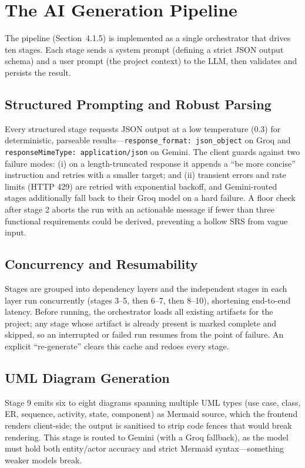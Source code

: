 \documentclass[12pt,a4paper,oneside]{report}
\begin{document}
\section{The AI Generation Pipeline}
The pipeline (Section~4.1.5) is implemented as a single orchestrator that drives ten stages. Each stage sends a system prompt (defining a strict JSON output schema) and a user prompt (the project context) to the LLM, then validates and persists the result.

\subsection{Structured Prompting and Robust Parsing}
Every structured stage requests JSON output at a low temperature (0.3) for deterministic, parseable results---\texttt{response\_format: json\_object} on Groq and \texttt{responseMimeType: application/json} on Gemini. The client guards against two failure modes: (i) on a length-truncated response it appends a ``be more concise'' instruction and retries with a smaller target; and (ii) transient errors and rate limits (HTTP 429) are retried with exponential backoff, and Gemini-routed stages additionally fall back to their Groq model on a hard failure. A floor check after stage 2 aborts the run with an actionable message if fewer than three functional requirements could be derived, preventing a hollow SRS from vague input.

\subsection{Concurrency and Resumability}
Stages are grouped into dependency layers and the independent stages in each layer run concurrently (stages 3--5, then 6--7, then 8--10), shortening end-to-end latency. Before running, the orchestrator loads all existing artifacts for the project; any stage whose artifact is already present is marked complete and skipped, so an interrupted or failed run resumes from the point of failure. An explicit ``re-generate'' clears this cache and redoes every stage.

\subsection{UML Diagram Generation}
Stage 9 emits six to eight diagrams spanning multiple UML types (use case, class, ER, sequence, activity, state, component) as Mermaid source, which the frontend renders client-side; the output is sanitised to strip code fences that would break rendering. This stage is routed to Gemini (with a Groq fallback), as the model must hold both entity/actor accuracy and strict Mermaid syntax---something weaker models break.
\end{document}
